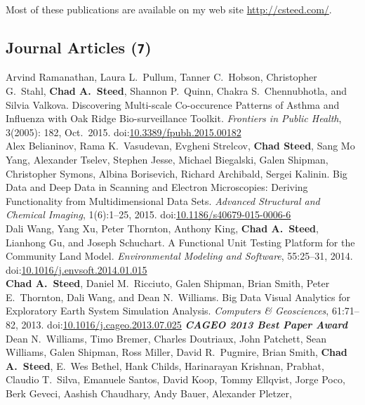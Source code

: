 \documentclass[11pt, a4paper]{article}
\newcommand{\amper}{{\fontspec[Scale=.95]{Hoefler Text}\selectfont\itshape\&}}
\newcommand{\years}[1]{\marginnote{\scriptsize #1}}
\begin{document}
Most of these publications are available on my web site \href{http://csteed.com/}{http://csteed.com/}.

\subsection*{Journal Articles (\texttt{7})}
\begin{sloppypar}
\noindent\years{2015}Arvind Ramanathan, Laura L.\ Pullum, Tanner C.\ Hobson,
Christopher G.\ Stahl, \textbf{Chad A.\ Steed}, Shannon P.\ Quinn,
Chakra S.\ Chennubhotla, and Silvia Valkova.  Discovering Multi-scale
Co-occurence Patterns of Asthma and Influenza with Oak Ridge Bio-surveillance
Toolkit. \emph{Frontiers in Public Health}, 3(2005): 182, Oct.\ 2015.
doi:\href{http://dx.doi.org/10.3389/fpubh.2015.00182}
{10.3389/fpubh.2015.00182}\\
\years{2015}Alex Belianinov, Rama K.\ Vasudevan, Evgheni Strelcov,
\textbf{Chad Steed}, Sang Mo Yang, Alexander Tselev, Stephen Jesse,
Michael Biegalski, Galen Shipman, Christopher Symons, Albina Borisevich,
Richard Archibald, Sergei Kalinin.  Big Data and Deep Data in Scanning
and Electron Microscopies: Deriving Functionality from Multidimensional Data
Sets. \emph{Advanced Structural and Chemical Imaging}, 1(6):1--25, 2015.
doi:\href{http://dx.doi.org/10.1186/s40679-015-0006-6}
{10.1186/s40679-015-0006-6}\\
\years{2014}Dali Wang, Yang Xu, Peter Thornton, Anthony King,
\textbf{Chad A.\ Steed}, Lianhong Gu, and Joseph Schuchart.
A Functional Unit Testing Platform for the Community Land Model.
\emph{Environmental Modeling and Software}, 55:25--31, 2014.
doi:\href{http://dx.doi.org/10.1016/j.envsoft.2014.01.015}
{10.1016/j.envsoft.2014.01.015}\\
\years{2013}\textbf{Chad A.\ Steed}, Daniel M.\ Ricciuto, Galen Shipman,
Brian Smith, Peter E.\ Thornton, Dali Wang, and Dean N.\ Williams.
Big Data Visual Analytics for Exploratory Earth System Simulation Analysis.
\emph{Computers \amper{} Geosciences}, 61:71--82, 2013.
doi:\href{http://dx.doi.org/10.1016/j.cageo.2013.07.025}
{10.1016/j.cageo.2013.07.025}
\textbf{\emph{CAGEO 2013 Best Paper Award}}\\
\years{2013}Dean N.\ Williams, Timo Bremer, Charles Doutriaux, John Patchett,
Sean Williams, Galen Shipman, Ross Miller, David R.\ Pugmire, Brian Smith,
\textbf{Chad A.\ Steed}, E.\ Wes Bethel, Hank Childs, Harinarayan Krishnan,
Prabhat, Claudio T.\ Silva, Emanuele Santos, David Koop, Tommy Ellqvist,
Jorge Poco, Berk Geveci, Aashish Chaudhary, Andy Bauer, Alexander Pletzer,

\end{sloppypar}
\end{document}
